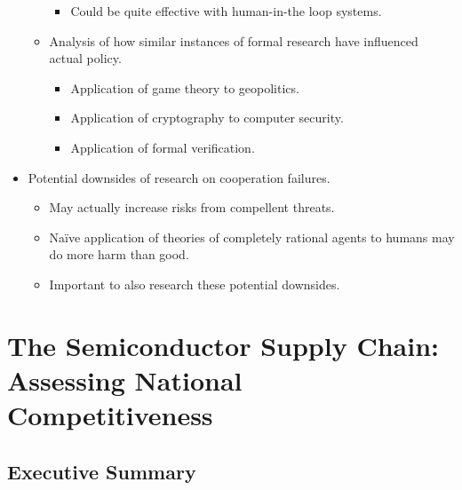 \begin{itemize}
\begin{itemize}
\begin{itemize}
            \item Could be quite effective with human-in-the loop systems.
        \end{itemize}
        \item Analysis of how similar instances of formal research have influenced actual policy.
        \begin{itemize}
            \item Application of game theory to geopolitics.
            \item Application of cryptography to computer security.
            \item Application of formal verification.
        \end{itemize}
    \end{itemize}
    \item Potential downsides of research on cooperation failures.
    \begin{itemize}
        \item May actually increase risks from compellent threats.
        \item Naïve application of theories of completely rational agents to humans may do more harm than good.
        \item Important to also research these potential downsides.
    \end{itemize}
\end{itemize}


\section{The Semiconductor Supply Chain: Assessing National Competitiveness}

\subsection{Executive Summary}

